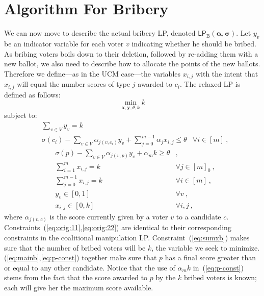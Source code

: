 \documentclass[letterpaper]{article} %
\theoremstyle{definition}
\newcommand\vecc{\mathbf}
\newcommand\vecgreek{\bm}
\newcommand{\veca}{\vecgreek{\alpha}}
\newcommand{\vecs}{\vecgreek{\sigma}}
\newcommand{\LPB}{\mathsf{LP}_{\mathrm{B}}}
\begin{document}
\section{Algorithm For Bribery}
We can now move to describe the actual bribery LP, denoted $\LPB(\veca,\vecs)$. Let $y_v$  be an indicator variable for  each voter $v$ indicating whether he should be bribed. As bribing voters boils down to their deletion, followed by re-adding them with a new ballot, we also need to describe how to allocate the points of the new ballots. Therefore we define---as in the UCM case---the variables $x_{i,j}$ with the intent that $x_{i,j}$ will equal the number scores of type $j$ awarded to $c_i$.  The  relaxed LP is defined as follows: 
\begin{equation*}
\min_{\vecc{x}, \vecc{y}, \theta,k} k
\end{equation*} 
subject to:
\begin{align}
&\sum_{v \in V}y_v = k &\label{eq:sumxb}\\
&\sigma(c_i) - \sum_{v \in V}\alpha_{j(v,c_i)} y_{v} + \sum_{j=0}^{m-1} \alpha_j x_{i,j}\leq \theta &\forall i\in[m]\label{eq:mainb}\ ,
\end{align}
\begin{align}
&\sigma(p) - \sum_{v \in V}\alpha_{j(v,p)} y_{v} + \alpha_m k \geq \theta &, \label{eq:p-const}\\
&\sum_{i=1}^m x_{i,j}=k &\forall j\in[m]_0\label{eq:orig:11}\ ,\\
&\sum_{j=0}^{m-1}x_{i,j}=k &\forall i\in[m]\label{eq:orig:22}\ ,\\
&y_{v} \in [0,1] & \forall v\ ,\\
&x_{i,j} \in [0,k] & \forall i,j\ ,
\end{align}
where $\alpha_{j(v,c)}$ is the score currently given by a voter $v$ to a candidate $c$. Constraints~(\ref{eq:orig:11},\ref{eq:orig:22}) are identical to their corresponding constraints in the coalitional manipulation LP. 
Constraint~(\ref{eq:sumxb}) makes sure that the number of bribed voters will be $k$, the variable we seek to minimize. 
(\ref{eq:mainb},\ref{eq:p-const}) together make sure that $p$ has a final score greater than or equal to any other candidate. 
Notice that the use of $\alpha_m k$ in~(\ref{eq:p-const})  stems from the fact that the score awarded to $p$ by the $k$ bribed voters is known; each will give her the maximum score available. 
\end{document}
